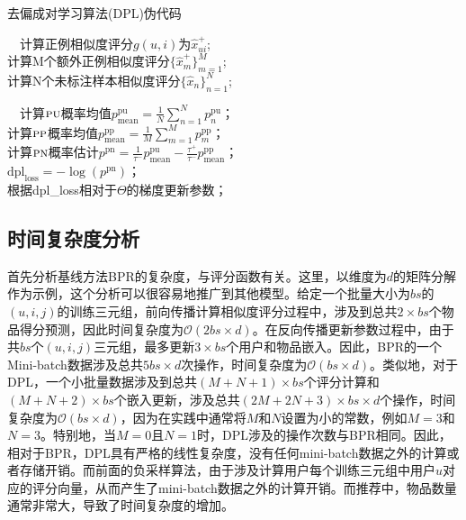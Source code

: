 \begin{algorithm}
	\SetAlgoLined
	\small
	\caption{去偏成对学习算法(DPL)伪代码}\label{4-Alg:2}
	~~计算正例相似度评分$g(u,i)$为$\hat{x}^+_{ui}$;\\
	计算M个额外正例相似度评分$\{\hat{x}^+_m\}_{m=1}^M$;\\
	计算N个未标注样本相似度评分$\{\hat{x}_n\}_{n=1}^N$;
	
	
	~~计算$\textsc{pu}$概率均值$p^\text{pu}_\text{mean} = \frac{1}{N}\sum_{n=1}^{N}p^\text{pu}_n$；\\
	计算$\textsc{pp}$概率均值$p^\text{pp}_\text{mean} = \frac{1}{M}\sum_{m=1}^{M}p^\text{pp}_m$；\\
	计算$\textsc{pn}$概率估计$p^\text{pn} = \frac{1}{\tau^-}p^\text{pu}_\text{mean}  - \frac{\tau^+}{\tau^-}p^\text{pp}_\text{mean}$；\\
	$\text{dpl}_\text{loss}   = - \log (p^\text{pn})$；\\
	根据dpl\_loss相对于$\Theta$的梯度更新参数；

\end{algorithm}
\subsection{时间复杂度分析}
首先分析基线方法BPR的复杂度，与评分函数有关。这里，以维度为$d$的矩阵分解作为示例，这个分析可以很容易地推广到其他模型。给定一个批量大小为$bs$的$(u,i,j)$的训练三元组，前向传播计算相似度评分过程中，涉及到总共$2\times bs$个物品得分预测，因此时间复杂度为$\mathcal O(2 bs\times d)$。在反向传播更新参数过程中，由于共$bs$个$(u,i,j)$三元组，最多更新$3 \times bs$个用户和物品嵌入。因此，BPR的一个Mini-batch数据涉及总共$5bs\times d$次操作，时间复杂度为$\mathcal O(bs\times d)$。类似地，对于DPL，一个小批量数据涉及到总共$(M+N+1)\times bs$个评分计算和$(M+N+2)\times bs$个嵌入更新，涉及总共$(2M+2N+3)\times bs\times d$个操作，时间复杂度为$\mathcal O(bs\times d)$，因为在实践中通常将$M$和$N$设置为小的常数，例如$M=3$和$N=3$。特别地，当$M=0$且$N=1$时，DPL涉及的操作次数与BPR相同。因此，相对于BPR，DPL具有严格的线性复杂度，没有任何mini-batch数据之外的计算或者存储开销。而前面的负采样算法，由于涉及计算用户每个训练三元组中用户$u$对应的评分向量，从而产生了mini-batch数据之外的计算开销。而推荐中，物品数量通常非常大，导致了时间复杂度的增加。

